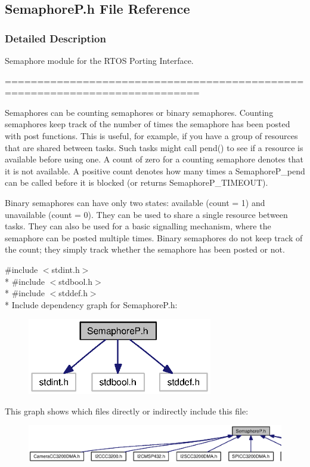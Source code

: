 \subsection{Semaphore\+P.\+h File Reference}
\label{_semaphore_p_8h}


\subsubsection{Detailed Description}
Semaphore module for the R\+T\+O\+S Porting Interface. 

============================================================================

Semaphores can be counting semaphores or binary semaphores. Counting semaphores keep track of the number of times the semaphore has been posted with post functions. This is useful, for example, if you have a group of resources that are shared between tasks. Such tasks might call pend() to see if a resource is available before using one. A count of zero for a counting semaphore denotes that it is not available. A positive count denotes how many times a Semaphore\+P\+\_\+pend can be called before it is blocked (or returns Semaphore\+P\+\_\+\+T\+I\+M\+E\+O\+U\+T).

Binary semaphores can have only two states\+: available (count = 1) and unavailable (count = 0). They can be used to share a single resource between tasks. They can also be used for a basic signalling mechanism, where the semaphore can be posted multiple times. Binary semaphores do not keep track of the count; they simply track whether the semaphore has been posted or not. 

{\ttfamily \#include $<$stdint.\+h$>$}\\*
{\ttfamily \#include $<$stdbool.\+h$>$}\\*
{\ttfamily \#include $<$stddef.\+h$>$}\\*
Include dependency graph for Semaphore\+P.\+h\+:
\nopagebreak
\begin{figure}[H]
\begin{center}
\leavevmode
\includegraphics[width=229pt]{_semaphore_p_8h__incl}
\end{center}
\end{figure}
This graph shows which files directly or indirectly include this file\+:
\nopagebreak
\begin{figure}[H]
\begin{center}
\leavevmode
\includegraphics[width=350pt]{_semaphore_p_8h__dep__incl}
\end{center}
\end{figure}

